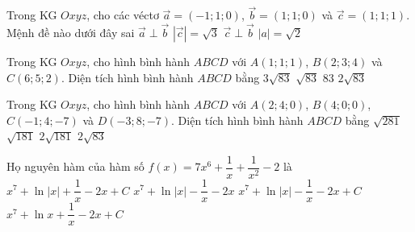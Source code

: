 \begin{ex}%
Trong KG $Oxyz$, cho các véctơ $\vec{a}=\left(-1;1;0\right)$, $\vec{b}=\left(1;1;0\right)$ và $\vec{c}=\left(1;1;1\right)$. Mệnh đề nào dưới đây sai
\choice
{$\vec{a} \perp \vec{b}$}
{$\left|\vec{c}\right|=\sqrt{3}$}
{\True $\vec{c}\perp \vec{b}$}
{$\left|a\right|=\sqrt{2}$}
\end{ex}

\begin{ex}%
Trong KG $Oxyz$, cho hình bình hành  $ABCD$ với  $A(1;1;1)$, $B(2;3;4)$ và $C(6;5;2)$. Diện tích hình bình hành $ABCD$  bằng \choice
{$3\sqrt{83} $}
{$\sqrt{83} $}
{$ 83 $}
{\True $2\sqrt{83}$}
\end{ex}

\begin{ex}%
Trong KG $Oxyz$, cho hình bình hành  $ABCD$ với  $A(2;4;0)$, $B(4;0;0)$,  $C(-1;4;-7)$ và $D(-3;8;-7)$. Diện tích hình bình hành $ABCD$  bằng \choice
{$\sqrt{281} $}
{$\sqrt{181} $}
{\True $ 2\sqrt{181} $}
{$2\sqrt{83}$}

\end{ex}

\begin{ex}%
Họ nguyên hàm của hàm số $f(x)=7 x^{6}+\dfrac{1}{x}+\dfrac{1}{x^2}-2$ là
\choice
{$x^{7}+\ln |x|+\dfrac{1}{x}-2x+C$}
{$x^{7}+\ln |x|-\dfrac{1}{x}-2x$}
{\True $x^{7}+\ln |x|-\dfrac{1}{x}-2x+C$}
{$x^{7}+\ln x+\dfrac{1}{x}-2x+C$}
\end{ex}

